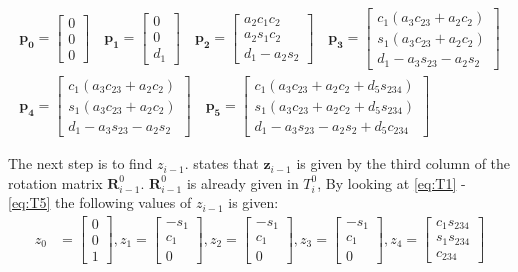 \begin{align*}
    \bm{p_0} = \begin{bmatrix} 0 \\ 0 \\ 0 \end{bmatrix}    \quad
    \bm{p_1} = \begin{bmatrix} 0 \\ 0 \\ d_1\end{bmatrix}    \quad
    \bm{p_2} = \begin{bmatrix} a_2c_1c_2\\ a_2s_1c_2\\ d_1 - a_2s_2\end{bmatrix}   \quad 
    \bm{p_3} = \begin{bmatrix} c_1(a_3c_{23} + a_2c_2) \\ s_1(a_3c_{23} + a_2c_2) \\ d_1 - a_3s_{23}-a_2s_2 \end{bmatrix}  \\  
    \bm{p_4} = \begin{bmatrix} c_1(a_3c_{23} + a_2c_2) \\ s_1(a_3c_{23} + a_2c_2) \\ d_1 - a_3s_{23}-a_2s_2\end{bmatrix}  \quad  
    \bm{p_5} = \begin{bmatrix} c_1(a_3c_{23} + a_2c_2 + d_5s_{234}) \\ s_1(a_3c_{23} + a_2c_2 + d_5s_{234}) \\ d_1 - a_3s_{23} - a_2s_2 + d_5c_{234} \end{bmatrix}    
\end{align*}

The next step is to find $z_{i-1}$. \cite{Siciliano} states that $\bm{z}_{i-1}$ is given by the third column of the rotation matrix $\bm{R}_{i-1}^0$. $\bm{R}_{i-1}^0$ is already given in $T_i^0$, By looking at \eqref{eq:T1} - \eqref{eq:T5} the following values of $z_{i-1}$ is given:
\begin{align*}
    z_0 &= \begin{bmatrix}0\\0\\1\end{bmatrix},
    z_1 = \begin{bmatrix}-s_1\\c_1\\0\end{bmatrix},
    z_2 = \begin{bmatrix}-s_1\\c_1\\0\end{bmatrix},
    z_3 = \begin{bmatrix}-s_1\\c_1\\0\end{bmatrix},
    z_4 = \begin{bmatrix}c_1s_{234}\\s_1s_{234}\\c_{234}\end{bmatrix}
\end{align*}

